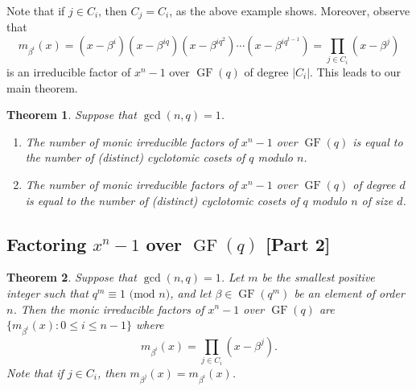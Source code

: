 \documentclass[10pt]{article}
\DeclareMathOperator{\GF}{GF}
\theoremstyle{newstyle}
\newtheorem{thm}{Theorem}[subsection]
\begin{document}
Note that if $j \in C_i$, then $C_j = C_i$, as the above example shows. Moreover, observe that 
\[ m_{\beta^i}(x) = (x-\beta^i)(x-\beta^{iq})(x-\beta^{iq^2}) \cdots (x-\beta^{iq^{t-1}}) = 
\prod_{j \in C_i} (x- \beta^j) \]
is an irreducible factor of $x^n-1$ over $\GF(q)$ of degree $|C_i|$. This leads to our main theorem. 

\begin{thm}
Suppose that $\gcd(n, q) = 1$.
\begin{enumerate}[(1)]
    \item The number of monic irreducible factors of $x^n-1$ over $\GF(q)$ is equal to the number 
    of (distinct) cyclotomic cosets of $q$ modulo $n$.
    \item The number of monic irreducible factors 
    of $x^n-1$ over $\GF(q)$ of degree $d$ is equal to the number of (distinct)
    cyclotomic cosets of $q$ modulo $n$ of size $d$. 
\end{enumerate}
\end{thm}

\subsection{Factoring $x^n-1$ over $\GF(q)$ [Part 2]}

\begin{thm}
Suppose that $\gcd(n, q) = 1$. Let $m$ be the smallest positive integer such that $q^m \equiv 1 
\text{ (mod $n$)}$, and let $\beta \in \GF(q^m)$ be an element of order $n$. Then the monic 
irreducible factors of $x^n-1$ over $\GF(q)$ are $\{m_{\beta^i}(x) : 0 \leq i \leq n-1\}$ where 
\[ m_{\beta^i}(x) = \prod_{j \in C_i} (x - \beta^j). \]
Note that if $j \in C_i$, then $m_{\beta^j}(x) = m_{\beta^i}(x)$. 
\end{thm}
\end{document}
